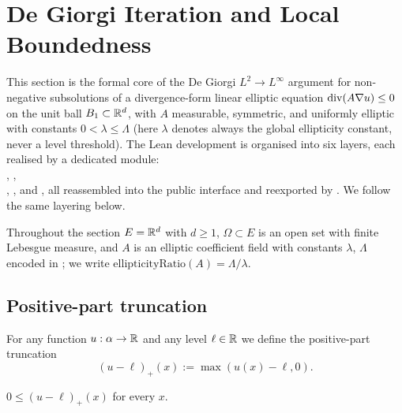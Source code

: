\chapter{De Giorgi Iteration and Local Boundedness}\label{sec:degiorgi}


This section is the formal core of the De Giorgi $L^2 \to L^\infty$
argument for non-negative subsolutions of a divergence-form linear
elliptic equation
$\operatorname{div}(A \nabla u) \le 0$
on the unit ball $B_{1} \subset \mathbb{R}^d$, with $A$ measurable, symmetric,
and uniformly elliptic with constants $0 < \lambda \le \Lambda$ (here
$\lambda$ denotes always the global ellipticity constant, never a level
threshold).  The Lean development is organised into six layers, each
realised by a dedicated module:\\
,
,\\
,
, and
,
all reassembled into the public interface
 and reexported by
.  We follow the same layering below.

Throughout the section $E = \mathbb{R}^d$ with $d \ge 1$, $\Omega \subset E$ is
an open set with finite Lebesgue measure, and $A$ is an elliptic
coefficient field with constants $\lambda$, $\Lambda$ encoded in
; we write $\mathrm{ellipticityRatio}(A) =
\Lambda/\lambda$.

\section{Positive-part truncation}

\begin{definition}
\label{def:positivePartSub}
\leanok
For any function $u : \alpha \to \mathbb{R}$ and any level $\ell \in \mathbb{R}$ we
define the positive-part truncation
\begin{equation*}
  (u-\ell)_+(x) := \max(u(x) - \ell, 0).
\end{equation*}
\end{definition}

\begin{lemma}
\label{lem:positivePartSub_nonneg}
\leanok
{}
$0 \le (u-\ell)_+(x)$ for every $x$.
\end{lemma}

